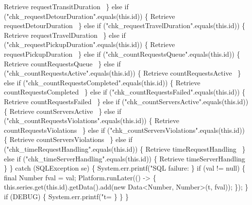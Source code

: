         \LA{}Retrieve requestTransitDuration~{\nwtagstyle{}}\RA{}
      \} else if ("chk_requestDetourDuration".equals(this.id)) \{
        \LA{}Retrieve requestDetourDuration~{\nwtagstyle{}}\RA{}
      \} else if ("chk_requestTravelDuration".equals(this.id)) \{
        \LA{}Retrieve requestTravelDuration~{\nwtagstyle{}}\RA{}
      \} else if ("chk_requestPickupDuration".equals(this.id)) \{
        \LA{}Retrieve requestPickupDuration~{\nwtagstyle{}}\RA{}
      \} else if ("chk_countRequestsQueue".equals(this.id)) \{
        \LA{}Retrieve countRequestsQueue~{\nwtagstyle{}}\RA{}
      \} else if ("chk_countRequestsActive".equals(this.id)) \{
        \LA{}Retrieve countRequestsActive~{\nwtagstyle{}}\RA{}
      \} else if ("chk_countRequestsCompleted".equals(this.id)) \{
        \LA{}Retrieve countRequestsCompleted~{\nwtagstyle{}}\RA{}
      \} else if ("chk_countRequestsFailed".equals(this.id)) \{
        \LA{}Retrieve countRequestsFailed~{\nwtagstyle{}}\RA{}
      \} else if ("chk_countServersActive".equals(this.id)) \{
        \LA{}Retrieve countServersActive~{\nwtagstyle{}}\RA{}
      \} else if ("chk_countRequestsViolations".equals(this.id)) \{
        \LA{}Retrieve countRequestsViolations~{\nwtagstyle{}}\RA{}
      \} else if ("chk_countServersViolations".equals(this.id)) \{
        \LA{}Retrieve countServersViolations~{\nwtagstyle{}}\RA{}
      \} else if ("chk_timeRequestHandling".equals(this.id)) \{
        \LA{}Retrieve timeRequestHandling~{\nwtagstyle{}}\RA{}
      \} else if ("chk_timeServerHandling".equals(this.id)) \{
        \LA{}Retrieve timeServerHandling~{\nwtagstyle{}}\RA{}
      \}
    \} catch (SQLException se) \{
      System.err.printf("SQL failure: %
    \}
    if (val != null) \{
      final Number fval = val;
      Platform.runLater(() -> \{
        this.series.get(this.id).getData().add(new Data<Number, Number>(t, fval));
      \});
    \}
    if (DEBUG) \{
      System.err.printf("t=%
    \}
  \}
\}
\nwendcode{}\nwdocspar

